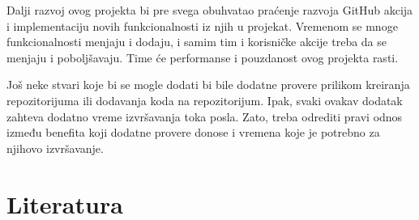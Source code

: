 \documentclass[12pt]{report}
\begin{document}
Dalji razvoj ovog projekta bi pre svega obuhvatao praćenje razvoja GitHub akcija i implementaciju novih funkcionalnosti iz njih u projekat. Vremenom se mnoge funkcionalnosti menjaju i dodaju, i samim tim i korisničke akcije treba da se menjaju i poboljšavaju. Time će performanse i pouzdanost ovog projekta rasti.

Još neke stvari koje bi se mogle dodati bi bile dodatne provere prilikom kreiranja repozitorijuma ili dodavanja koda na repozitorijum. Ipak, svaki ovakav dodatak zahteva dodatno vreme izvršavanja toka posla. Zato, treba odrediti pravi odnos između benefita koji dodatne provere donose i vremena koje je potrebno za njihovo izvršavanje.

\chapter{Literatura}
\sloppy
\printbibliography[heading=none]
\end{document}
